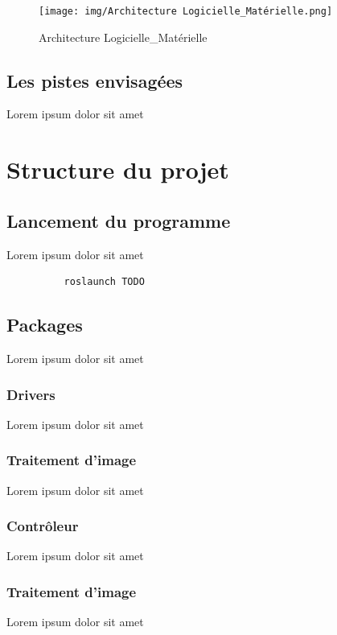 \documentclass[12pt, openany]{report}
\begin{document}
      \begin{figure}[H]
      \begin{center}
        \hfill \texttt{[image: img/Architecture Logicielle\_Matérielle.png]} \hspace*{\fill}
        \caption[le titre]{Architecture Logicielle_Matérielle}
      \end{center}
      \end{figure}


\subsection{Les pistes envisagées}
Lorem ipsum dolor sit amet

\section{Structure du projet}
\subsection{Lancement du programme}
Lorem ipsum dolor sit amet

\begin{lstlisting}
          roslaunch TODO
    \end{lstlisting}

\subsection{Packages}
Lorem ipsum dolor sit amet

\subsubsection{Drivers}
Lorem ipsum dolor sit amet

\subsubsection{Traitement d'image}
Lorem ipsum dolor sit amet

\subsubsection{Contrôleur}
Lorem ipsum dolor sit amet

\subsubsection{Traitement d'image}
Lorem ipsum dolor sit amet
\end{document}
